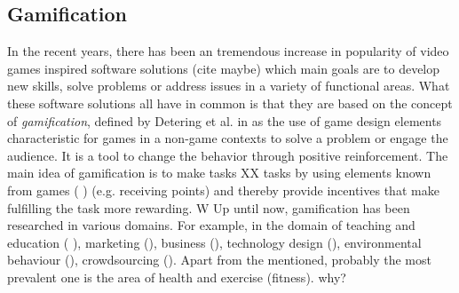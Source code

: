 \subsection{Gamification}
In the recent years, there has been an tremendous increase in popularity of
video games inspired software solutions (cite maybe) which main goals are to
develop new skills, solve problems or address issues in a variety of
functional areas. What these software solutions all have in common is that they
are based on the concept of \textit{gamification}, defined by Detering et al. in  as the
use of game design elements characteristic for games in a non-game contexts to solve a problem or engage the audience. 
It is a tool to change the behavior through positive reinforcement. 
The main idea of gamification is to make tasks XX tasks  by using elements
known from games
(%
) (e.g. receiving points) and thereby provide
incentives that make fulfilling the task more rewarding. W
Up until now, gamification has been researched in various domains. For example,
in the domain of teaching and education (%
), marketing (), business
(), technology design (), environmental behaviour (), crowdsourcing (). Apart
from the mentioned, probably the most prevalent one is the area of health and exercise (fitness). 
why?

